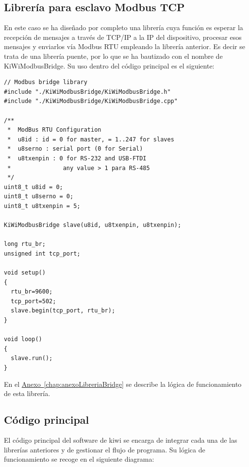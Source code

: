 \subsection{Librería para esclavo Modbus TCP}
\label{subsec:esclavoTCPkiwi}

En este caso se ha diseñado por completo una librería cuya función es esperar la recepción de mensajes a través de TCP/IP a la IP del dispositivo, procesar esos mensajes y enviarlos vía Modbus RTU empleando la librería anterior. Es decir se trata de una librería puente, por lo que se ha bautizado con el nombre de KiWiModbusBridge. Su uso dentro del código principal es el siguiente:

\begin{lstlisting}
// Modbus bridge library
#include "./KiWiModbusBridge/KiWiModbusBridge.h"
#include "./KiWiModbusBridge/KiWiModbusBridge.cpp"

/**
 *  ModBus RTU Configuration
 *  u8id : id = 0 for master, = 1..247 for slaves
 *  u8serno : serial port (0 for Serial)
 *  u8txenpin : 0 for RS-232 and USB-FTDI 
 *               any value > 1 para RS-485
 */
uint8_t u8id = 0; 
uint8_t u8serno = 0;   
uint8_t u8txenpin = 5;  

KiWiModbusBridge slave(u8id, u8txenpin, u8txenpin);

long rtu_br;
unsigned int tcp_port;

void setup()
{
  rtu_br=9600;
  tcp_port=502;
  slave.begin(tcp_port, rtu_br);
}

void loop()
{
  slave.run();
}

\end{lstlisting}

En el \hyperref[chap:anexoLibreriaBridge]{Anexo~\ref{chap:anexoLibreriaBridge}} se describe la lógica de funcionamiento de esta librería.

\subsection{Código principal}
\label{subsec:mainCodeKiwi}

El código principal del software de kiwi se encarga de integrar cada una de las librerías anteriores y de gestionar el flujo de programa. Su lógica de funcionamiento se recoge en el siguiente diagrama:

